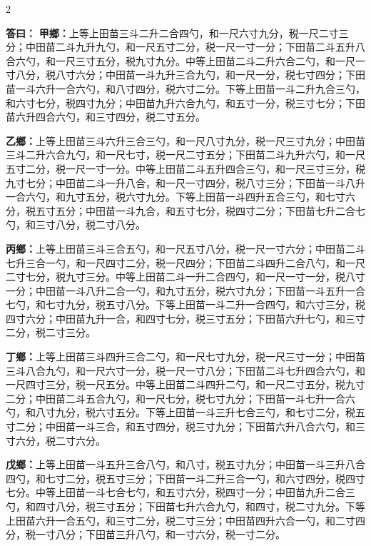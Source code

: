 \documentclass[11pt,a4paper]{article}
\newcommand{\AnswerText}[1]{\par\noindent\textbf{\color{answercolor}答曰：}#1\par}
\begin{document}
\begin{paracol}{2}

\AnswerText{
\textbf{甲鄉：}上等上田苗三斗二升二合四勺，和一尺六寸九分，税一尺二寸三分；中田苗二斗九升九勺，和一尺五寸二分，税一尺一寸一分；下田苗二斗五升八合六勺，和一尺三寸五分，税九寸九分。中等上田苗二斗二升六合二勺，和一尺一寸八分，税八寸六分；中田苗一斗九升三合九勺，和一尺一分，税七寸四分；下田苗一斗六升一合六勺，和八寸四分，税六寸二分。下等上田苗一斗二升九合三勺，和六寸七分，税四寸九分；中田苗九升六合九勺，和五寸一分，税三寸七分；下田苗六升四合六勺，和三寸四分，税二寸五分。

\textbf{乙鄉：}上等上田苗三斗六升三合三勺，和一尺八寸九分，税一尺三寸九分；中田苗三斗二升六合九勺，和一尺七寸，税一尺二寸五分；下田苗二斗九升六勺，和一尺五寸二分，税一尺一寸一分。中等上田苗二斗五升四合三勺，和一尺三寸三分，税九寸七分；中田苗二斗一升八合，和一尺一寸四分，税八寸三分；下田苗一斗八升一合六勺，和九寸五分，税六寸九分。下等上田苗一斗四升五合三勺，和七寸六分，税五寸五分；中田苗一斗九合，和五寸七分，税四寸二分；下田苗七升二合七勺，和三寸八分，税二寸八分。

\textbf{丙鄉：}上等上田苗三斗三合五勺，和一尺五寸八分，税一尺一寸六分；中田苗二斗七升三合一勺，和一尺四寸二分，税一尺四分；下田苗二斗四升二合八勺，和一尺二寸七分，税九寸三分。中等上田苗二斗一升二合四勺，和一尺一寸一分，税八寸一分；中田苗一斗八升二合一勺，和九寸五分，税六寸九分；下田苗一斗五升一合七勺，和七寸九分，税五寸八分。下等上田苗一斗二升一合四勺，和六寸三分，税四寸六分；中田苗九升一合，和四寸七分，税三寸五分；下田苗六升七勺，和三寸二分，税二寸三分。

\textbf{丁鄉：}上等上田苗三斗四升三合二勺，和一尺七寸九分，税一尺三寸一分；中田苗三斗八合九勺，和一尺六寸一分，税一尺一寸八分；下田苗二斗七升四合六勺，和一尺四寸三分，税一尺五分。中等上田苗二斗四升二勺，和一尺二寸五分，税九寸二分；中田苗二斗五合九勺，和一尺七分，税七寸九分；下田苗一斗七升一合六勺，和八寸九分，税六寸五分。下等上田苗一斗三升七合三勺，和七寸二分，税五寸二分；中田苗一斗三合，和五寸四分，税三寸九分；下田苗六升八合六勺，和三寸六分，税二寸六分。

\textbf{戊鄉：}上等上田苗一斗五升三合八勺，和八寸，税五寸九分；中田苗一斗三升八合四勺，和七寸二分，税五寸三分；下田苗一斗二升三合一勺，和六寸四分，税四寸七分。中等上田苗一斗七合七勺，和五寸六分，税四寸一分；中田苗九升二合三勺，和四寸八分，税三寸五分；下田苗七升六合九勺，和四寸，税二寸九分。下等上田苗六升一合五勺，和三寸二分，税二寸三分；中田苗四升六合一勺，和二寸四分，税一寸八分；下田苗三升八勺，和一寸六分，税一寸二分。

}
\end{paracol}
\end{document}
